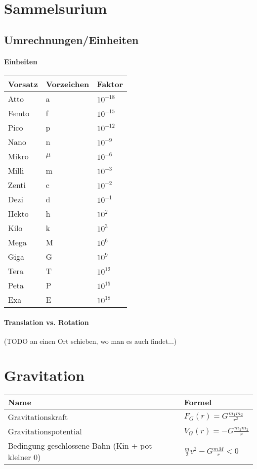 \section{Sammelsurium}

\subsection{Umrechnungen/Einheiten}
\paragraph{Einheiten}
\begin{tabbing}
	\begin{tabu} to \linewidth {l l X}
		\toprule
		Vorsatz & Vorzeichen & Faktor \\
		\midrule
		Atto  & a & $10^{-18}$ \\
		Femto & f & $10^{-15}$ \\
		Pico & p & $10^{-12}$ \\
		Nano & n & $10^{-9}$ \\
		Mikro & $\mu$ & $10^{-6}$ \\
		Milli & m & $10^{-3}$ \\
		Zenti & c & $10^{-2}$ \\
		Dezi & d & $10^{-1}$ \\
		Hekto & h & $10^{2}$ \\
		Kilo & k & $10^{3}$ \\
		Mega & M & $10^{6}$ \\
		Giga & G & $10^{9}$ \\
		Tera & T & $10^{12}$\\
		Peta & P & $10^{15}$\\
		Exa & E & $10^{18}$ \\
		\bottomrule
	 \end{tabu}
\end{tabbing}


\newpage

\paragraph{Translation vs. Rotation} (TODO an einen Ort schieben, wo man es auch findet...)



\section{Gravitation}

\begin{tabbing}
	\begin{tabu} to \linewidth {l X}
		\toprule
		Name & Formel \\
		\midrule
		Gravitationskraft  & $ F_{G}(r) = G\frac{m_{1}m_{2}}{r^2} $ \\
		Gravitationspotential & $V_{G}(r) =  -G\frac{m_{1}m_{2}}{r} $ \\
		Bedingung geschlossene Bahn (Kin + pot kleiner 0) & $ \frac{m}{2} v^2 - G\frac{mM}{r}<0$ \\
		\bottomrule
	 \end{tabu}
\end{tabbing}


